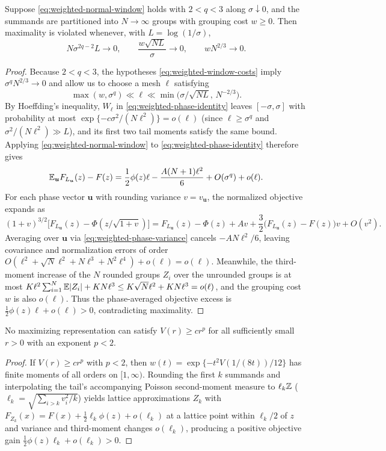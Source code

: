 \begin{lemma}\label{lem:weighted-window-phase}
Suppose \eqref{eq:weighted-normal-window} holds with $2<q<3$ along
$\sigma\downarrow0$, and the summands are partitioned into $N\to\infty$
groups with grouping cost $w\ge0$. Then maximality is violated whenever, with
$L=\log(1/\sigma)$,
\begin{equation}\label{eq:weighted-window-costs}
 N\sigma^{2q-2}L\longrightarrow0,\qquad
       \frac{w\sqrt{NL}}{\sigma}\longrightarrow0,\qquad wN^{2/3}\longrightarrow0.
\end{equation}
\end{lemma}
\begin{proof}
Because $2<q<3$, the hypotheses \eqref{eq:weighted-window-costs} imply
$\sigma^qN^{2/3}\to0$ and allow us to choose a mesh $\ell$ satisfying
\[
 \max(w,\sigma^q)\ll\ell\ll\min\bigl(\sigma/\sqrt{NL},\,N^{-2/3}\bigr).
\]
By Hoeffding's inequality, $W_\ell$ in \eqref{eq:weighted-phase-identity}
leaves $[-\sigma,\sigma]$ with probability at most $\exp\{-c\sigma^2/(N\ell^2)\}=o(\ell)$
(since $\ell\ge\sigma^q$ and $\sigma^2/(N\ell^2)\gg L$), and its first two
tail moments satisfy the same bound. Applying \eqref{eq:weighted-normal-window}
to \eqref{eq:weighted-phase-identity} therefore gives
\[
 \mathbb E_{\boldsymbol u}F_{L_{\boldsymbol u}}(z)-F(z)
 =\frac12\phi(z)\ell-\frac{A(N+1)\ell^2}{6}+O(\sigma^q)+o(\ell).
\]
For each phase vector $\boldsymbol u$ with rounding variance
$v=v_{\boldsymbol u}$, the normalized objective expands as
\[
 (1+v)^{3/2}\bigl[F_{L_{\boldsymbol u}}(z)-\Phi(z/\sqrt{1+v})\bigr]
 =F_{L_{\boldsymbol u}}(z)-\Phi(z)+Av
  +\frac32\bigl(F_{L_{\boldsymbol u}}(z)-F(z)\bigr)v+O(v^2).
\]
Averaging over $\boldsymbol u$ via \eqref{eq:weighted-phase-variance} cancels
$-AN\ell^2/6$, leaving covariance and normalization errors of order
$O(\ell^2+\sqrt N\ell^2+N\ell^3+N^2\ell^4)+o(\ell)=o(\ell)$. Meanwhile, the
third-moment increase of the $N$ rounded groups $Z_i$ over the unrounded
groups is at most $K\ell^2\sum_{i=1}^N\mathbb E|Z_i|+KN\ell^3\le K\sqrt N\ell^2+KN\ell^3=o(\ell)$,
and the grouping cost $w$ is also $o(\ell)$. Thus the phase-averaged objective
excess is $\frac12\phi(z)\ell+o(\ell)>0$, contradicting maximality.
\end{proof}

\begin{lemma}\label{lem:weighted-Fourier}
No maximizing representation can satisfy $V(r)\ge cr^p$ for all sufficiently
small $r>0$ with an exponent $p<2$.
\end{lemma}
\begin{proof}
If $V(r)\ge cr^p$ with $p<2$, then $w(t)=\exp\{-t^2V(1/(8t))/12\}$ has finite
moments of all orders on $[1,\infty)$. Rounding the first $k$ summands and
interpolating the tail's accompanying Poisson second-moment measure to
$\ell_k\mathbb Z$ ($\ell_k=\sqrt{\sum_{i>k}v_i^2/k}$) yields lattice approximations
$Z_k$ with $F_{Z_k}(x)=F(x)+\frac12\ell_k\phi(z)+o(\ell_k)$ at a lattice
point within $\ell_k/2$ of $z$ and variance and third-moment changes
$o(\ell_k)$, producing a positive objective gain $\frac12\phi(z)\ell_k+o(\ell_k)>0$.
\end{proof}

